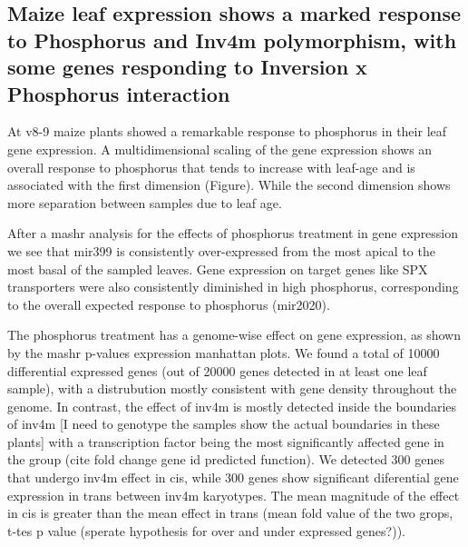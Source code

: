 \subsection{Maize leaf expression shows a marked response to Phosphorus and Inv4m polymorphism, with some genes responding to Inversion x Phosphorus interaction}



At v8-9 maize plants showed a remarkable response to phosphorus in their leaf gene expression.
A multidimensional scaling of the gene expression shows an overall response to phosphorus that tends to increase with leaf-age and is associated with  the first dimension (Figure). 
While the second dimension shows more separation between samples due to leaf age.

After a mashr analysis for the effects of phosphorus treatment in gene expression we see that mir399 is consistently over-expressed from the most apical to the most basal of the sampled leaves.
Gene expression on target genes like SPX transporters were also consistently diminished in high phosphorus, corresponding to the overall expected response to phosphorus (mir2020).

The phosphorus treatment has a genome-wise effect on gene expression, as shown by the mashr p-values {expression manhattan plots}. We found a total of 10000 differential expressed genes (out of 20000 genes detected in at least one leaf sample), with a distrubution mostly consistent with gene density throughout the genome. 
In contrast, the effect of inv4m is mostly detected inside the boundaries of inv4m [I need to genotype the samples  show the actual boundaries  in these plants] with a  transcription factor being the most significantly affected gene in the group (cite fold change gene id predicted function).
We detected 300 genes that undergo inv4m effect in cis, while 300 genes show significant diferential gene expression in trans between inv4m karyotypes.
The mean magnitude of the effect in cis is greater than the mean effect in trans (mean fold value of the two grops, t-tes p value (sperate hypothesis for over and under expressed genes?)).

